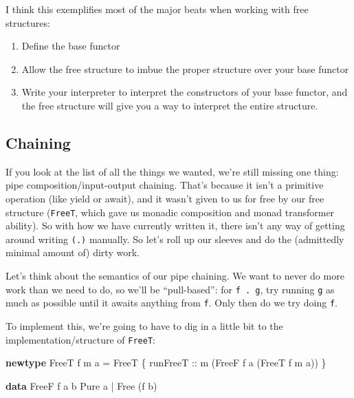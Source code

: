 \documentclass[]{article}
\newenvironment{Shaded}{}{}
\newcommand{\DataTypeTok}[1]{\textcolor[rgb]{0.56,0.13,0.00}{#1}}
\newcommand{\KeywordTok}[1]{\textcolor[rgb]{0.00,0.44,0.13}{\textbf{#1}}}
\newcommand{\NormalTok}[1]{#1}
\newcommand{\OperatorTok}[1]{\textcolor[rgb]{0.40,0.40,0.40}{#1}}
\newcommand{\OtherTok}[1]{\textcolor[rgb]{0.00,0.44,0.13}{#1}}
\begin{document}
I think this exemplifies most of the major beats when working with free
structures:

\begin{enumerate}
\def\labelenumi{\arabic{enumi}.}
\tightlist
\item
  Define the base functor
\item
  Allow the free structure to imbue the proper structure over your base functor
\item
  Write your interpreter to interpret the constructors of your base functor, and
  the free structure will give you a way to interpret the entire structure.
\end{enumerate}

\hypertarget{chaining}{%
\subsection{Chaining}\label{chaining}}

If you look at the list of all the things we wanted, we're still missing one
thing: pipe composition/input-output chaining. That's because it isn't a
primitive operation (like yield or await), and it wasn't given to us for free by
our free structure (\texttt{FreeT}, which gave us monadic composition and monad
transformer ability). So with how we have currently written it, there isn't any
way of getting around writing \texttt{(.\textbar{})} manually. So let's roll up
our sleeves and do the (admittedly minimal amount of) dirty work.

Let's think about the semantics of our pipe chaining. We want to never do more
work than we need to do, so we'll be ``pull-based'': for
\texttt{f\ .\textbar{}\ g}, try running \texttt{g} as much as possible until it
awaits anything from \texttt{f}. Only then do we try doing \texttt{f}.

To implement this, we're going to have to dig in a little bit to the
implementation/structure of \texttt{FreeT}:

\begin{Shaded}
\begin{Highlighting}[]
\KeywordTok{newtype} \DataTypeTok{FreeT}\NormalTok{ f m a }\OtherTok{=} \DataTypeTok{FreeT}
\NormalTok{    \{}\OtherTok{ runFreeT ::}\NormalTok{ m (}\DataTypeTok{FreeF}\NormalTok{ f a (}\DataTypeTok{FreeT}\NormalTok{ f m a)) \}}

\KeywordTok{data} \DataTypeTok{FreeF}\NormalTok{ f a b}
      \DataTypeTok{Pure}\NormalTok{ a}
    \OperatorTok{|} \DataTypeTok{Free}\NormalTok{ (f b)}
\end{Highlighting}
\end{Shaded}
\end{document}
